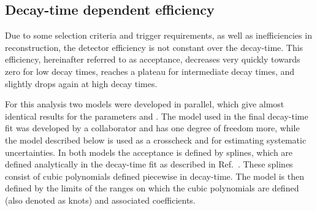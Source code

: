 \subsection{Decay-time dependent efficiency}
\label{sec:acceptance}

Due to some selection criteria and trigger requirements, as well as inefficiencies in \velo reconstruction, the detector efficiency is not constant over the \Bz decay-time.
This efficiency, hereinafter referred to as acceptance, decreases very quickly towards zero for low decay times, reaches a plateau for intermediate decay times, and slightly drops again at high decay times.

For this analysis two models were developed in parallel, which give almost identical results for the \CP parameters \Sf and \Sfbar.
The model used in the final decay-time fit was developed by a collaborator and has one degree of freedom more, while the model described below is used as a crosscheck and for estimating systematic uncertainties.
In both models the acceptance is defined by splines, which are defined analytically in the decay-time fit as described in Ref.~\cite{Karbach:2014qba}.
These splines consist of cubic polynomials defined piecewise in decay-time.
The model is then defined by the limits of the ranges on which the cubic polynomials are defined (also denoted as knots) and associated coefficients.

